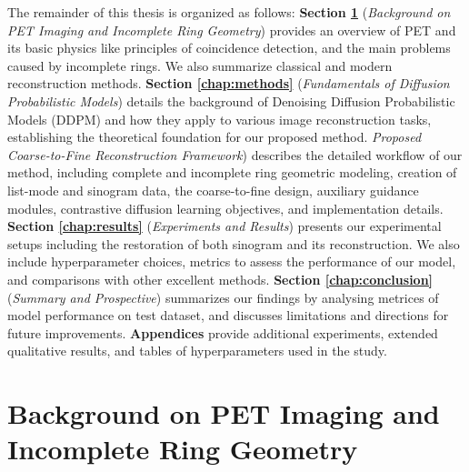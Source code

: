 \documentclass[12pt]{iopart}
\begin{document}
The remainder of this thesis is organized as follows:
\textbf{Section \ref{chap:background}} (\emph{Background on PET Imaging and Incomplete Ring Geometry}) provides an overview of PET and its basic physics like principles of coincidence detection, and the main problems caused by incomplete rings. We also summarize classical and modern reconstruction methods.
\textbf{Section \ref{chap:methods}} (\emph{Fundamentals of Diffusion Probabilistic Models}) details the background of Denoising Diffusion Probabilistic Models (DDPM) and how they apply to various image reconstruction tasks, establishing the theoretical foundation for our proposed method. \emph{Proposed Coarse-to-Fine Reconstruction Framework}) describes the detailed workflow of our method, including complete and incomplete ring geometric modeling, creation of list-mode and sinogram data, the coarse-to-fine design, auxiliary guidance modules, contrastive diffusion learning objectives, and implementation details.
\textbf{Section \ref{chap:results}} (\emph{Experiments and Results}) presents our experimental setups including the restoration of both sinogram and its reconstruction. We also include hyperparameter choices, metrics to assess the performance of our model, and comparisons with other excellent methods. 
\textbf{Section \ref{chap:conclusion}} (\emph{Summary and Prospective}) summarizes our findings by analysing metrices of model performance on test dataset, and discusses limitations and directions for future improvements.
\textbf{Appendices} provide additional experiments, extended qualitative results, and tables of hyperparameters used in the study.




\section{Background on PET Imaging and Incomplete Ring Geometry}

\label{chap:background}


\end{document}
